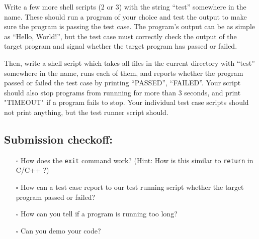 \documentclass{article}
\begin{document}
\noindent
Write a few more shell scripts (2 or 3) with the string ``test'' somewhere in the name. These
should run a program of your choice and test the output to make sure the program is passing
the test case. The program's output can be as simple as ``Hello, World!'', but
the test case must correctly check the output of the target program and signal
whether the target program has passed or failed.

\noindent
Then, write a shell script which takes all files in the current directory with
``test'' somewhere in the name, runs each of them, and reports whether the
program passed or failed the test case by printing ``PASSED'', ``FAILED''. Your
script should also stop programs from runnning for more than 3 seconds, and
print "TIMEOUT" if a program fails to stop. Your individual test case scripts
should not print anything, but the test runner script should.


\subsection*{Submission checkoff:}
\begin{itemize}
  \item[$\square$] How does the \texttt{exit} command work? (Hint: How is this similar to
    \texttt{return} in C/C++ ?)
  \item[$\square$] How can a test case report to our test running script whether the target program passed or failed?
  \item[$\square$] How can you tell if a program is running too long?
  \item[$\square$] Can you demo your code?
\end{itemize}
\end{document}
